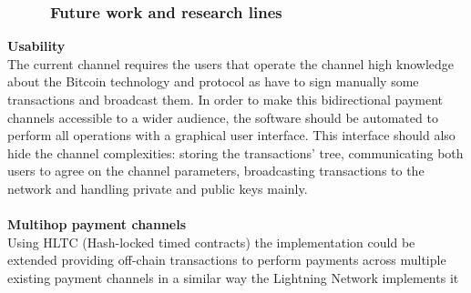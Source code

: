 \documentclass[12pt,journal,compsoc]{IEEEtran}
\begin{document}
\subsubsection{\ \ \ \ \ Future work and research lines}
\textbf{Usability}\\
The current channel requires the users that operate the channel high knowledge about the Bitcoin technology and protocol as have to sign manually some transactions and broadcast them. In order to make this bidirectional payment channels accessible to a wider audience, the software should be automated to perform all operations with a graphical user interface. This interface should also hide the channel complexities: storing the transactions' tree, communicating both users to agree on the channel parameters, broadcasting transactions to the network and handling private and public keys mainly.\\\\
\textbf{Multihop payment channels}\\
Using HLTC (Hash-locked timed contracts\cite{HashedTi42:online}) the implementation could be extended providing off-chain transactions to perform payments across multiple existing payment channels in a similar way the Lightning Network implements it\cite{poon2015bitcoin}
%
%

\end{document}
